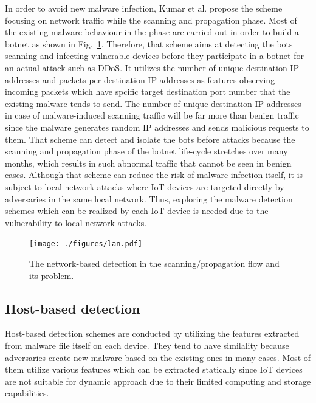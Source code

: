 \documentclass{ieeeaccess}
\newcommand{\myfigurename}{Fig.}
\begin{document}
In order to avoid new malware infection, Kumar et al. \cite{net} propose the scheme focusing on network traffic while the scanning and propagation phase.
Most of the existing malware behaviour in the phase are carried out in order to build a botnet as shown in \myfigurename~\ref{fig:lan}.
Therefore, that scheme aims at detecting the bots scanning and infecting vulnerable devices before they participate in a botnet for an actual attack such as DDoS.
It utilizes the number of unique destination IP addresses and packets per destination IP addresses as features observing incoming packets which have spcific target destination port number that the existing malware tends to send.
The number of unique destination IP addresses in case of malware-induced scanning traffic will be far more than benign traffic since the malware generates random IP addresses and sends malicious requests to them.
That scheme can detect and isolate the bots before attacks because the scanning and propagation phase of the botnet life-cycle stretches over many months, which results in such abnormal traffic that cannot be seen in benign cases.
Although that scheme can reduce the risk of malware infection itself, it is subject to local network attacks where IoT devices are targeted directly by adversaries in the same local network.
Thus, exploring the malware detection schemes which can be realized by each IoT device is needed due to the vulnerability to local network attacks.

\begin{figure}[t]
 \centering
 \texttt{[image: ./figures/lan.pdf]}
 \caption{The network-based detection in the scanning/propagation flow and its problem.} 
 \label{fig:lan}
\end{figure}

\subsection{Host-based detection}
Host-based detection schemes are conducted by utilizing the features extracted from malware file itself on each device.
They tend to have similality because adversaries create new malware based on the existing ones \cite{om, hwang, cfg, cfg2, op-graph, func-graph, api-graph} in many cases.
Most of them utilize various features which can be extracted statically since IoT devices are not suitable for dynamic approach due to their limited computing and storage capabilities.
\end{document}
